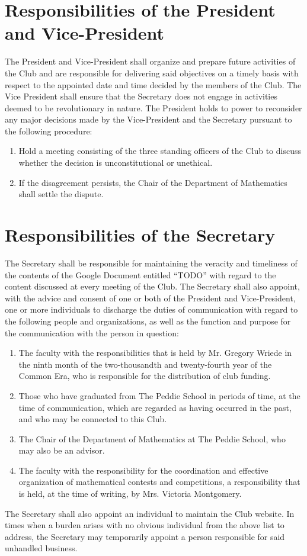 \documentclass[12pt, letterpaper]{article}
\begin{document}
\section{Responsibilities of the President and Vice-President}
The President and Vice-President shall organize and prepare future activities of the Club and are responsible for delivering said objectives on a timely basis with respect to the appointed date and time decided by the members of the Club. The Vice President shall ensure that the Secretary does not engage in activities deemed to be revolutionary in nature. The President holds to power to reconsider any major decisions made by the Vice-President and the Secretary pursuant to the following procedure:
\begin{enumerate}
	\item Hold a meeting consisting of the three standing officers of the Club to discuss whether the decision is unconstitutional or unethical.
	\item If the disagreement persists, the Chair of the Department of Mathematics shall settle the dispute.
\end{enumerate}

\section{Responsibilities of the Secretary}
The Secretary shall be responsible for maintaining the veracity and timeliness of the contents of the Google Document entitled ``TODO'' with regard to the content discussed at every meeting of the Club. The Secretary shall also appoint, with the advice and consent of one or both of the President and Vice-President, one or more individuals to discharge the duties of communication with regard to the following people and organizations, as well as the function and purpose for the communication with the person in question:
\begin{enumerate}
	\item The faculty with the responsibilities that is held by Mr. Gregory Wriede in the ninth month of the two-thousandth and twenty-fourth year of the Common Era, who is responsible for the distribution of club funding.
	\item Those who have graduated from The Peddie School in periods of time, at the time of communication, which are regarded as having occurred in the past, and who may be connected to this Club.
	\item The Chair of the Department of Mathematics at The Peddie School, who may also be an advisor.
	\item The faculty with the responsibility for the coordination and effective organization of mathematical contests and competitions, a responsibility that is held, at the time of writing, by Mrs. Victoria Montgomery.
\end{enumerate}
The Secretary shall also appoint an individual to maintain the Club website. In times when a burden arises with no obvious individual from the above list to address, the Secretary may temporarily appoint a person responsible for said unhandled business.
\end{document}
